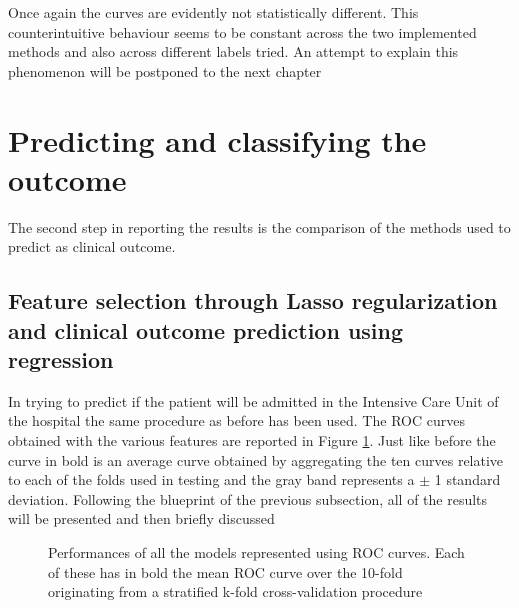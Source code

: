 Once again the curves are evidently not statistically different. This counterintuitive behaviour seems to be constant across the two implemented methods and also across different labels tried. An attempt to explain this phenomenon will be postponed to the next chapter


\section{Predicting and classifying the outcome \icu}
The second step in reporting the results is the comparison of the methods used to predict \icu as clinical outcome.

\subsection{Feature selection through Lasso regularization and clinical outcome prediction using regression}

In trying to predict if the patient will be admitted in the Intensive Care Unit of the hospital the same procedure as before has been used. The ROC curves obtained with the various features are reported in Figure \ref{fig:ICULasso}. Just like before the curve in bold is an average curve obtained by aggregating the ten curves relative to each of the folds used in testing and the gray band represents a $\pm$ 1 standard deviation.
Following the blueprint of the previous subsection, all of the results will be presented and then briefly discussed


\begin{figure}[H]
\centering
	\newline
        \caption{Performances of all the models represented using ROC curves. Each of these has in bold the mean ROC curve over the 10-fold originating from a stratified k-fold cross-validation procedure}\label{fig:ICULasso}
\end{figure}

